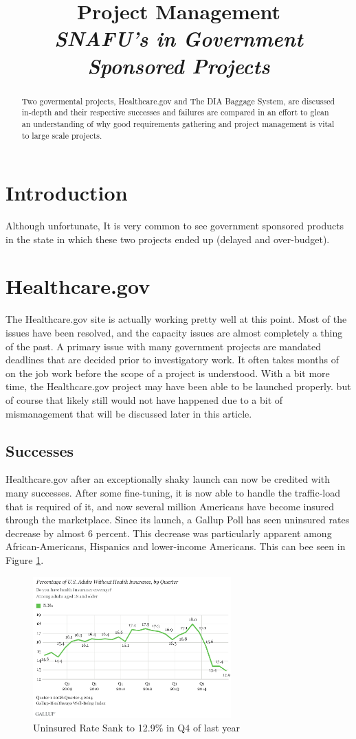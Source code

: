 \documentclass[conference]{IEEEtran}
\title{Project Management\\\em\large{SNAFU's in Government Sponsored Projects}}
\author{\IEEEauthorblockN{Daniel Fallon, Student}
	\IEEEauthorblockA{Department of Computer Science,\\ College of Science, \\Illinois Institute of Technology, \\Chicago IL 60616}}
\begin{document}
\maketitle

\begin{abstract}
Two govermental projects, Healthcare.gov and The DIA Baggage System, are discussed in-depth and their respective successes and failures are compared in an effort to glean an understanding of why good requirements gathering and project management is vital to large scale projects.
\end{abstract}

\section{Introduction}
	Although unfortunate, It is very common to see government sponsored products in the state in which these two projects ended up (delayed and over-budget). 
\section{Healthcare.gov}
	The Healthcare.gov site is actually working pretty well at this point. Most of the issues have been resolved, and the capacity issues are almost completely a thing of the past. A primary issue with many government projects are mandated deadlines that are decided prior to investigatory work. It often takes months of on the job work before the scope of a project is understood. With a bit more time, the Healthcare.gov project may have been able to be launched properly. but of course that likely still would not have happened due to a bit of mismanagement that will be discussed later in this article.
	\subsection{Successes}
	Healthcare.gov after an exceptionally shaky launch can now be credited with many successes. After some fine-tuning, it is now able to handle the traffic-load that is required of it, and now several million Americans have become insured through the marketplace. Since its launch, a Gallup Poll has seen uninsured rates decrease by almost 6 percent. This decrease was particularly apparent among African-Americans, Hispanics and lower-income Americans. This can bee seen in Figure \ref{fig:uninsured-percent}. \cite{hc_gallup} 
	\begin{figure}[h]
		\centering
			\includegraphics[width=3in]{graph-healthcare-percentage.png}
		\caption{Uninsured Rate Sank to 12.9\% in Q4 of last year}
		\label{fig:uninsured-percent}
	\end{figure}
\end{document}
